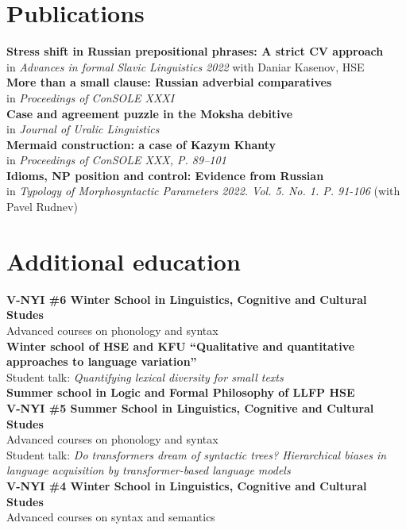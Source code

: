\documentclass[11pt]{article} %
\begin{document}
\section*{Publications}
 \textbf{Stress shift in Russian prepositional phrases: A strict CV approach} \\ in \emph{Advances in formal Slavic Linguistics 2022} with Daniar Kasenov, HSE\\
 \textbf{More than a small clause: Russian adverbial comparatives} \\ in \emph{Proceedings of ConSOLE XXXI}\\
 \textbf{Case and agreement puzzle in the Moksha debitive} \\ in \emph{Journal of Uralic Linguistics}\\
 \textbf{Mermaid construction: a case of Kazym Khanty}\\ in \emph{Proceedings of ConSOLE XXX, P. 89--101}\\
 \textbf{Idioms, NP position and control: Evidence from Russian}\\ in \emph{Typology of Morphosyntactic Parameters 2022. Vol. 5. No. 1. P. 91-106} (with Pavel Rudnev)\\

\section*{Additional education}
 \textbf{V-NYI \#6 Winter School in Linguistics, Cognitive and Cultural Studes}\\
{Advanced courses on phonology and syntax}\\
 \textbf{Winter school of HSE and KFU ``Qualitative and quantitative approaches to language variation''}\\
{Student talk: \emph{Quantifying lexical diversity for small texts}}\\
 \textbf{Summer school in Logic and Formal Philosophy of LLFP HSE}\\
 \textbf{V-NYI \#5 Summer School in Linguistics, Cognitive and Cultural Studes}\\
{Advanced courses on phonology and syntax}\\
{Student talk: \emph{Do transformers dream of syntactic trees? Hierarchical biases in language acquisition by transformer-based language models}}\\
 \textbf{V-NYI \#4 Winter School in Linguistics, Cognitive and Cultural Studes}\\
{Advanced courses on syntax and semantics}\\
\end{document}
